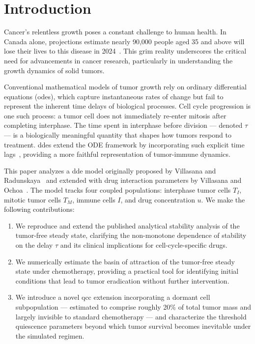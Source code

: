 \section{Introduction}
\label{sec:intro}

Cancer's relentless growth poses a constant challenge to human health. In Canada alone, projections estimate nearly 90,000 people aged 35 and above will lose their lives to this disease in 2024~\cite{Pader2021}. This grim reality underscores the critical need for advancements in cancer research, particularly in understanding the growth dynamics of solid tumors.

Conventional mathematical models of tumor growth rely on ordinary differential equations (\gls{ode}s), which capture instantaneous rates of change but fail to represent the inherent time delays of biological processes. Cell cycle progression is one such process: a tumor cell does not immediately re-enter mitosis after completing interphase. The time spent in interphase before division --- denoted $\tau$ --- is a biologically meaningful quantity that shapes how tumors respond to treatment. \gls{dde}s extend the ODE framework by incorporating such explicit time lags~\cite{Niculescu2021}, providing a more faithful representation of tumor-immune dynamics.

This paper analyzes a \gls{dde} model originally proposed by Villasana and Radunskaya~\cite{villasana2003} and extended with drug interaction parameters by Villasana and Ochoa~\cite{villasana2004}. The model tracks four coupled populations: interphase tumor cells $T_I$, mitotic tumor cells $T_M$, immune cells $I$, and drug concentration $u$. We make the following contributions:

\begin{enumerate}
  \item We reproduce and extend the published analytical stability analysis of the
    tumor-free steady state, clarifying the non-monotone dependence of stability on
    the delay $\tau$ and its clinical implications for cell-cycle-specific drugs.
  \item We numerically estimate the basin of attraction of the tumor-free steady state
    under chemotherapy, providing a practical tool for identifying initial conditions
    that lead to tumor eradication without further intervention.
  \item We introduce a novel \gls{qcc} extension incorporating a dormant cell
    subpopulation --- estimated to comprise roughly 20\% of total tumor mass and
    largely invisible to standard chemotherapy --- and characterize the threshold
    quiescence parameters beyond which tumor survival becomes inevitable under the
    simulated regimen.
\end{enumerate}

